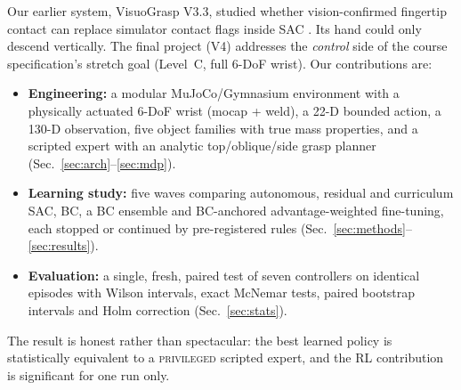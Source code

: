 \documentclass[conference,10pt]{IEEEtran}
\newcommand{\priv}{\textsc{privileged}}
\begin{document}
Our earlier system, VisuoGrasp V3.3, studied whether vision-confirmed fingertip contact can replace simulator contact flags
inside SAC \cite{haarnoja2018sac}. Its hand could only descend vertically. The final project (V4) addresses the
\emph{control} side of the course specification's stretch goal (Level~C, full 6-DoF wrist). Our contributions are:
\begin{itemize}
\item \textbf{Engineering:} a modular MuJoCo/Gymnasium environment with a physically actuated 6-DoF wrist (mocap + weld), a
22-D bounded action, a 130-D observation, five object families with true mass properties, and a scripted expert with an
analytic top/oblique/side grasp planner (Sec.~\ref{sec:arch}--\ref{sec:mdp}).
\item \textbf{Learning study:} five waves comparing autonomous, residual and curriculum SAC, BC, a BC ensemble and
BC-anchored advantage-weighted fine-tuning, each stopped or continued by pre-registered rules (Sec.~\ref{sec:methods}--\ref{sec:results}).
\item \textbf{Evaluation:} a single, fresh, paired test of seven controllers on identical episodes with Wilson intervals,
exact McNemar tests, paired bootstrap intervals and Holm correction (Sec.~\ref{sec:stats}).
\end{itemize}
The result is honest rather than spectacular: the best learned policy is statistically equivalent to a \priv{} scripted
expert, and the RL contribution is significant for one run only.
\end{document}
